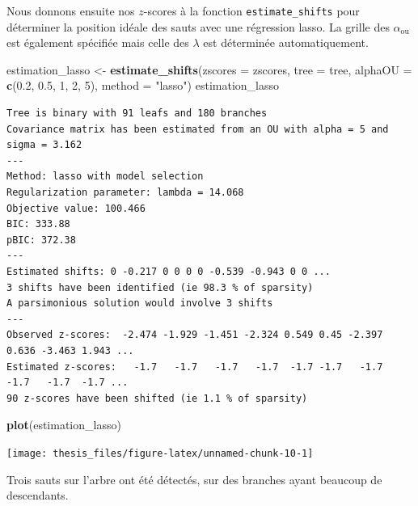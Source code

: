 \documentclass[12pt,a4paper]{reedthesis}
\newenvironment{Shaded}{\begin{snugshade}}{\end{snugshade}}
\newcommand{\DataTypeTok}[1]{\textcolor[rgb]{0.13,0.29,0.53}{#1}}
\newcommand{\DecValTok}[1]{\textcolor[rgb]{0.00,0.00,0.81}{#1}}
\newcommand{\FloatTok}[1]{\textcolor[rgb]{0.00,0.00,0.81}{#1}}
\newcommand{\KeywordTok}[1]{\textcolor[rgb]{0.13,0.29,0.53}{\textbf{#1}}}
\newcommand{\NormalTok}[1]{#1}
\newcommand{\StringTok}[1]{\textcolor[rgb]{0.31,0.60,0.02}{#1}}
\newcommand \ou [1]{{#1}_{\text{ou}}}
\theoremstyle{definition}
\theoremstyle{definition}
\theoremstyle{definition}
\theoremstyle{remark}
\begin{document}
Nous donnons ensuite nos \(z\)-scores à la fonction \texttt{estimate\_shifts} pour déterminer la position idéale des sauts avec une régression lasso. La grille des \(\ou{\alpha}\) est également spécifiée mais celle des \(\lambda\) est déterminée automatiquement.
\begin{Shaded}
\begin{Highlighting}[]
\NormalTok{estimation_lasso <-}\StringTok{ }\KeywordTok{estimate_shifts}\NormalTok{(}\DataTypeTok{zscores =}\NormalTok{ zscores, }\DataTypeTok{tree =}\NormalTok{ tree, }
                                    \DataTypeTok{alphaOU =} \KeywordTok{c}\NormalTok{(}\FloatTok{0.2}\NormalTok{, }\FloatTok{0.5}\NormalTok{, }\DecValTok{1}\NormalTok{, }\DecValTok{2}\NormalTok{, }\DecValTok{5}\NormalTok{),}
                                    \DataTypeTok{method =} \StringTok{"lasso"}\NormalTok{)}
\NormalTok{estimation_lasso}
\end{Highlighting}
\end{Shaded}
\begin{verbatim}
Tree is binary with 91 leafs and 180 branches
Covariance matrix has been estimated from an OU with alpha = 5 and sigma = 3.162 
---
Method: lasso with model selection
Regularization parameter: lambda = 14.068 
Objective value: 100.466
BIC: 333.88
pBIC: 372.38
---
Estimated shifts: 0 -0.217 0 0 0 0 -0.539 -0.943 0 0 ...
3 shifts have been identified (ie 98.3 % of sparsity)
A parsimonious solution would involve 3 shifts
---
Observed z-scores:  -2.474 -1.929 -1.451 -2.324 0.549 0.45 -2.397 0.636 -3.463 1.943 ...
Estimated z-scores:   -1.7   -1.7   -1.7   -1.7  -1.7 -1.7   -1.7  -1.7   -1.7  -1.7 ...
90 z-scores have been shifted (ie 1.1 % of sparsity)
\end{verbatim}
\begin{Shaded}
\begin{Highlighting}[]
\KeywordTok{plot}\NormalTok{(estimation_lasso)}
\end{Highlighting}
\end{Shaded}
\begin{center}\texttt{[image: thesis\_files/figure-latex/unnamed-chunk-10-1]} \end{center}

Trois sauts sur l'arbre ont été détectés, sur des branches ayant beaucoup de descendants.
\end{document}
